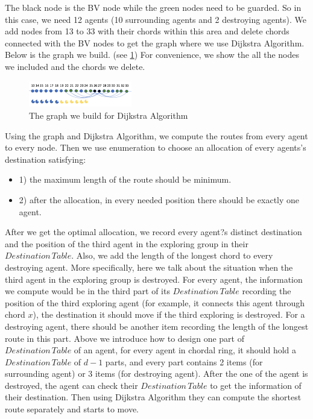 \documentclass[conference]{IEEEtran}
\begin{document}
The black node is the BV node while the green nodes need to be guarded. So in this case, we need 12 agents (10 surrounding agents and 2 destroying agents). 
We add nodes from 13 to 33 with their chords within this area and delete chords connected with the BV nodes to get the graph where we use Dijkstra Algorithm. Below is the graph we build. (see \ref{fig:D2}) For convenience, we show the all the nodes we included and the chords we delete.
\begin{figure}[H]
  \centering  
  \includegraphics[width=0.4\textwidth]{figures/D2.png}
  \caption{The graph we build for Dijkstra Algorithm}\label{fig:D2}
\end{figure} 
Using the graph and Dijkstra Algorithm, we compute the routes from every agent to every node. Then we use enumeration to choose an allocation of every agents's destination satisfying: 
\begin{itemize}
\item 1) the maximum length of the route should be minimum. 
\item 2) after the allocation, in every needed position there should be exactly one agent.
\end{itemize}
After we get the optimal allocation, we record every agent?s distinct destination and the position of the third agent in the exploring group in their $Destination\,Table$. Also, we add the length of the longest chord to every destroying agent.
More specifically, here we talk about the situation when the third agent in the exploring group is destroyed. For every agent, the information we compute would be in the third part of its $Destination\,Table$ recording the position of the third exploring agent (for example, it connects this agent through chord $x$), the destination it should move if the third exploring is destroyed. For a destroying agent, there should be another item recording the length of the longest route in this part.
Above we introduce how to design one part of $Destination\,Table$ of an agent, for every agent in chordal ring, it should hold a $Destination\,Table$ of $d-1$ parts, and every part contains 2 items (for surrounding agent) or 3 items (for destroying agent).
After the one of the agent is destroyed, the agent can check their $Destination\,Table$ to get the information of their destination. Then using Dijkstra Algorithm they can compute the shortest route separately and starts to move.
\end{document}
